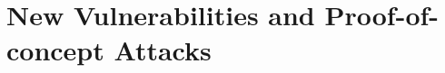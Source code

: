 \documentclass[sigconf]{acmart}
\begin{document}
{%







\clearpage



\clearpage

\appendix

\clearpage




\section{New Vulnerabilities and Proof-of-concept Attacks}
\label{append:new_vulnerabilities_v1_v7}


}
\end{document}
